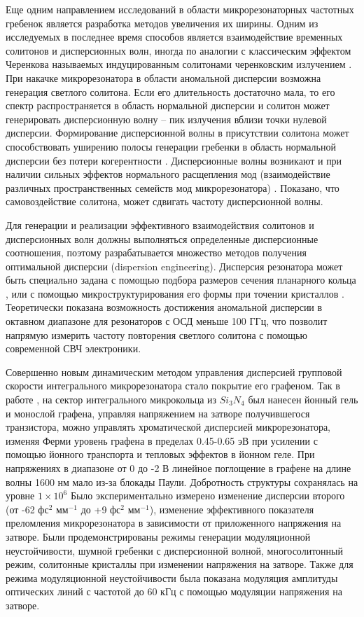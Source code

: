 Еще одним направлением исследований в области микрорезонаторных частотных гребенок является разработка методов увеличения их ширины. Одним из исследуемых в последнее время способов является взаимодействие временных солитонов и дисперсионных волн, иногда по аналогии с классическим эффектом Черенкова называемых индуцированным  солитонами черенковским излучением \cite{Akhmediev1995,Barashenkov2011,Milian2014}. При накачке микрорезонатора в области аномальной дисперсии возможна генерация светлого солитона. Если его длительность достаточно мала, то его спектр распространяется в область нормальной дисперсии и солитон может генерировать дисперсионную волну – пик излучения вблизи точки нулевой дисперсии. Формирование дисперсионной волны в присутствии солитона может способствовать уширению полосы генерации гребенки в область нормальной дисперсии без потери когерентности \cite{Brasch2016,Jang2014,Pfeiffer:17}. Дисперсионные волны возникают и при наличии сильных эффектов нормального расщепления мод (взаимодействие различных пространственных семейств мод микрорезонатора) \cite{Yang2016,Matsko:16}. Показано, что самовоздействие солитона, может сдвигать частоту дисперсионной волны.

Для генерации и реализации эффективного взаимодействия солитонов и дисперсионных волн должны выполняться определенные дисперсионные соотношения, поэтому разрабатывается множество методов получения оптимальной дисперсии (dispersion engineering). Дисперсия резонатора может быть специально задана с помощью подбора размеров сечения планарного кольца \cite{Okawachi2014,Pfeiffer:17}, или с помощью микроструктурирования его формы при точении кристаллов \cite{Grudinin2012,Grudinin2015,Nakagawa2016}. Теоретически показана возможность достижения аномальной дисперсии в октавном диапазоне для резонаторов с ОСД меньше 100 ГГц, что позволит напрямую измерить частоту повторения светлого солитона с помощью современной СВЧ электроники.

Совершенно новым динамическим методом управления дисперсией групповой скорости интегрального микрорезонатора стало покрытие его графеном. Так в работе \cite{Yao2018}, на сектор интегрального микрокольца из $Si_3N_4$ был нанесен йонный гель и монослой графена, управляя напряжением на затворе получившегося транзистора, можно управлять хроматической дисперсией микрорезонатора, изменяя Ферми уровень графена в пределах 0.45-0.65 эВ при усилении с помощью йонного транспорта и тепловых эффектов в йонном геле. При напряжениях в диапазоне от 0 до -2 В линейное поглощение в графене на длине волны 1600 нм мало из-за блокады Паули. Добротность структуры сохранялась на уровне $1\times10^6$ Было экспериментально измерено изменение дисперсии второго (от -62 фс$^2$ мм$^{-1}$ до +9 фс$^2$ мм$^{-1}$), изменение эффективного показателя преломления микрорезонатора в зависимости от приложенного напряжения на затворе. Были продемонстрированы режимы генерации модуляционной неустойчивости, шумной гребенки с дисперсионной волной, многосолитонный режим, солитонные кристаллы при изменении напряжения на затворе. Также для режима модуляционной неустойчивости была показана модуляция амплитуды оптических линий с частотой до 60 кГц с помощью модуляции напряжения на затворе.

